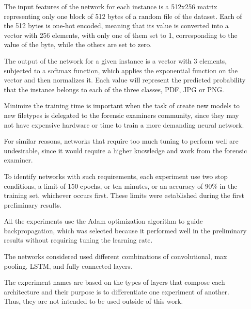 
The input features of the network for each instance is a 512x256 matrix representing only one block of 512 bytes of a random file of the dataset. Each of the 512 bytes is one-hot encoded, meaning that its value is converted into a vector with 256 elements, with only one of them set to 1, corresponding to the value of the byte, while the others are set to zero.

The output of the network for a given instance is a vector with 3 elements, subjected to a softmax function, which applies the exponential function on the vector and then normalizes it. Each value will represent the predicted probability that the instance belongs to each of the three classes, PDF, JPG or PNG.

Minimize the training time is important when the task of create new models to new filetypes is delegated to the forensic examiners community, since they may not have expensive hardware or time to train a more demanding neural network.

For similar reasons, networks that require too much tuning to perform well are undesirable, since it would require a higher knowledge and work from the forensic examiner.


To identify networks with such requirements, each experiment use two stop conditions, a limit of 150 epochs, or ten minutes, or an accuracy of 90\% in the training set, whichever occurs first. These limits were established during the first preliminary results.

All the experiments use the Adam \cite{kingma_adam:_2014}
optimization algorithm to guide backpropagation, which was selected because it performed well in the preliminary results without requiring tuning the learning rate.

The networks considered used different combinations of convolutional, max pooling, LSTM, and fully connected layers.

The experiment names are based on the types of layers that compose each architecture and their purpose is to differentiate one experiment of another. Thus, they are not intended to be used outside of this work.


